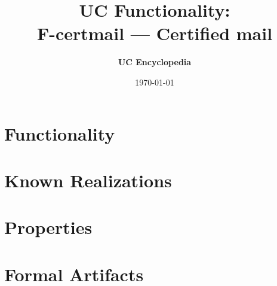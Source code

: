 \documentclass[11pt,a4paper]{article}
\title{\textbf{\Large UC Functionality:}\\[0.2em] \Large F-certmail --- Certified mail}
\author{\textbf{UC Encyclopedia}}
\date{\today}
\newtheorem{functionality}{Functionality}
\begin{document}
\maketitle

\begin{abstract}
\end{abstract}

\section{Functionality}

%

\section{Known Realizations}


\section{Properties}


\section{Formal Artifacts}

\end{document}
